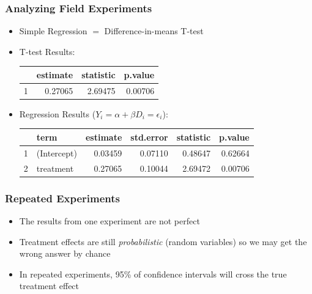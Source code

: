 \documentclass[xcolor=x11names,compress]{beamer}\usepackage[]{graphicx}\usepackage[]{color}
\makeatletter
\newenvironment{kframe}{%
 \def\at@end@of@kframe{}%
 \ifinner\ifhmode%
  \def\at@end@of@kframe{\end{minipage}}%
  \begin{minipage}{\columnwidth}%
 \fi\fi%
 \def\FrameCommand##1{\hskip\@totalleftmargin \hskip-\fboxsep
 \colorbox{shadecolor}{##1}\hskip-\fboxsep
     \hskip-\linewidth \hskip-\@totalleftmargin \hskip\columnwidth}%
 \MakeFramed {\advance\hsize-\width
   \@totalleftmargin\z@ \linewidth\hsize
   \@setminipage}}%
 {\par\unskip\endMakeFramed%
 \at@end@of@kframe}
\newenvironment{knitrout}{}{} %
\renewcommand{\(}{\begin{columns}}
\renewcommand{\)}{\end{columns}}
\newcommand{\<}[1]{\begin{column}{#1}}
\renewcommand{\>}{\end{column}}
\makeatother
\begin{document}
\begin{frame}
\frametitle{Analyzing Field Experiments}
\begin{itemize}
\item Simple Regression $=$ Difference-in-means T-test
\pause
\footnotesize
\item T-test Results:
\begin{table}[ht]
\centering
\begin{tabular}{rrrr}
  \hline
 & estimate & statistic & p.value \\ 
  \hline
1 & 0.27065 & 2.69475 & 0.00706 \\ 
   \hline
\end{tabular}
\end{table}

\pause
\item Regression Results ($Y_i = \alpha + \beta D_i = \epsilon_i$):
\begin{table}[ht]
\centering
\begin{tabular}{rlrrrr}
  \hline
 & term & estimate & std.error & statistic & p.value \\ 
  \hline
1 & (Intercept) & 0.03459 & 0.07110 & 0.48647 & 0.62664 \\ 
  2 & treatment & 0.27065 & 0.10044 & 2.69472 & 0.00706 \\ 
   \hline
\end{tabular}
\end{table}

\end{itemize}
\normalsize
\end{frame}

\begin{frame}
\frametitle{Repeated Experiments}
\begin{itemize}
\item The results from one experiment are not perfect
\pause
\item Treatment effects are still \textit{probabilistic} (random variables) so we may get the wrong answer by chance
\pause
\item In repeated experiments, 95\% of confidence intervals will cross the true treatment effect
\end{itemize}
\begin{knitrout}
\color{fgcolor}\begin{kframe}


{\ttfamily\noindent\bfseries\color{errorcolor}{\#\# Error in eval(predvars, data, env): object 'Y' not found}}\end{kframe}
\end{knitrout}
\end{frame}
\end{document}
